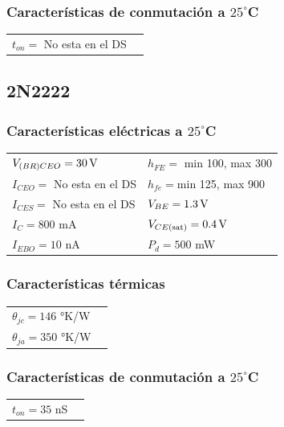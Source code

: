 \documentclass[chaptersright]{informeutn}
\begin{document}
    \subsubsection{Características de conmutación a $25^\circ$C}
    \begin{tabular}{ll}
    $t_{on} = $ No esta en el DS \\
      \end{tabular}

  \subsection{2N2222}
    
    \subsubsection{Características eléctricas a $25^\circ$C}
    \begin{tabular}{ll}
    $V_{(BR)CEO} =  30 \,\mathrm{V}$         & \hspace{2cm} $h_{FE} =$ min 100, max 300 \\
    $I_{CEO} = $ No esta en el DS           & \hspace{2cm} $h_{fe} = $min 125, max 900 \\
    $I_{CES} = $ No esta en el DS               & \hspace{2cm} $V_{BE} = 1.3 \,\mathrm{V} $ \\
    $I_C = 800$ mA                & \hspace{2cm} $V_{CE(\text{sat})} =0.4 \,\mathrm{V} $ \\
    $I_{EBO} = 10$ nA              & \hspace{2cm} $P_d = 500$ mW \\
    \end{tabular}
    
    \subsubsection{Características térmicas}
    \begin{tabular}{ll}
    $\theta_{jc} = 146$ °K/W \\
    $\theta_{ja} = 350$ °K/W\\
    \end{tabular}
    
    \subsubsection{Características de conmutación a $25^\circ$C}
    \begin{tabular}{ll}
    $t_{on} = 35$ nS \\
    \end{tabular}
\end{document}
